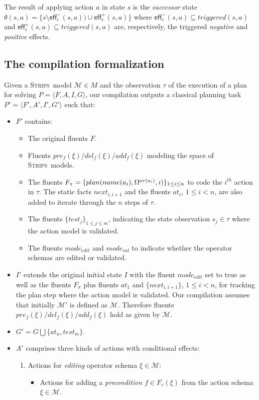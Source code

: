 \documentclass[letterpaper]{article} %
\newcommand{\tup}[1]{{\langle #1 \rangle}}
\newcommand{\eff}{\mathsf{eff}}     %
\newcommand{\strips}{\textsc{Strips}}     %
\begin{document}
The result of applying action $a$ in state $s$ is the {\em successor} state $\theta(s,a)=\{s\setminus\eff_c^-(s,a))\cup\eff_c^+(s,a)\}$ where $\eff_c^-(s,a)\subseteq triggered(s,a)$ and $\eff_c^+(s,a)\subseteq triggered(s,a)$ are, respectively, the triggered {\em negative} and {\em positive} effects.


\subsection{The compilation formalization}
Given a \strips\ model $\mathcal{M}\in M$ and the observation $\tau$ of the execution of a plan for solving $P=\tup{F,A,I,G}$, our compilation outputs a classical planning task $P'=\tup{F',A',I',G'}$ such that:
\begin{itemize}
\item $F'$ contains:
\begin{itemize}
\item The original fluents $F$. 
\item Fluents $pre_f(\xi)/del_f(\xi)/add_f(\xi)$ modeling the space of \strips\ models. 
\item The fluents $F_{\pi}=\{plan(name(a_i),\Omega^{ar(a_i)},i)\}_{\small 1\leq i\leq n}$ to code the $i^{th}$ action in $\tau$. The static facts $next_{i,i+1}$ and the fluents $at_i$, {\small $1\leq i< n$}, are also added to iterate through the $n$ steps of $\tau$.
\item The fluents $\{test_j\}_{1\leq j\leq m}$, indicating the state observation $s_j\in\tau$ where the action model is validated.
\item The fluents $mode_{edit}$ and $mode_{val}$ to indicate whether the operator schemas are edited or validated.
\end{itemize}
\item $I'$ extends the original initial state $I$ with the fluent $mode_{edit}$ set to true as well as the fluents $F_{\pi}$ plus fluents $at_1$ and $\{next_{i,i+1}\}$, {\small $1\leq i<n$}, for tracking the plan step where the action model is validated. Our compilation assumes that initially $\mathcal{M}'$ is defined as $\mathcal{M}$. Therefore fluents $pre_f(\xi)/del_f(\xi)/add_f(\xi)$ hold as given by $\mathcal{M}$.

\item $G'=G\bigcup\{at_n,test_m\}$.
\item $A'$ comprises three kinds of actions with conditional effects:
\begin{enumerate}
\item Actions for {\em editing} operator schema $\xi\in\mathcal{M}$:
\begin{itemize}
\item Actions for adding a {\em precondition} $f\in F_v(\xi)$ from the action schema $\xi\in\mathcal{M}$.


\end{itemize}
\end{enumerate}
\end{itemize}
\end{document}
